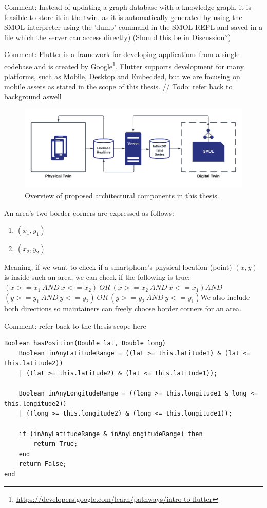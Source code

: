 \documentclass{article}
\begin{document}
Comment: Instead of updating a graph database with a knowledge graph, it is feasible to store it in the twin, as it is automatically generated by using the SMOL interpreter using the 'dump' command in the SMOL REPL and saved in a file which the server can access directly) (Should this be in Discussion?)

Comment: Flutter is a framework for developing applications from a single codebase and is created by Google\footnote{\url{https://developers.google.com/learn/pathways/intro-to-flutter}}. Flutter supports development for many platforms, such as Mobile, Desktop and Embedded, but we are focusing on mobile assets as stated in the \hyperref[subsec:Scope]{scope of this thesis}.
// Todo: refer back to background aswell

\begin{figure}[H]
    \centering
    \includegraphics[scale=0.12]{graphics/thesis_overview.png}
    \caption{Overview of proposed architectural components in this thesis.}
    \label{fig:components}
\end{figure}

An area's two border corners are expressed as follows:
\begin{enumerate}
    \item $(x_1, y_1)$
    \item $(x_2, y_2)$
\end{enumerate}
Meaning, if we want to check if a smartphone's physical location (point) $(x, y)$ is inside such an area, we can check if the following is true:\newline\newline$(x >= x_1\:AND\: x <= x_2)\:OR\:(x >= x_2\:AND\:x <= x_1)$\newline$AND$\newline$(y >= y_1\:AND\:y <= y_2)\:OR\:(y >= y_2\:AND\:y <= y_1)$\newline We also include both directions so maintainers can freely choose border corners for an area. 

Comment: refer back to the thesis scope here
\begin{verbatim}
Boolean hasPosition(Double lat, Double long)
    Boolean inAnyLatitudeRange = ((lat >= this.latitude1) & (lat <= this.latitude2)) 
    | ((lat >= this.latitude2) & (lat <= this.latitude1));
    
    Boolean inAnyLongitudeRange = ((long >= this.longitude1 & long <= this.longitude2)) 
    | ((long >= this.longitude2) & (long <= this.longitude1));

    if (inAnyLatitudeRange & inAnyLongitudeRange) then
        return True;
    end
    return False;
end
\end{verbatim}
\end{document}
